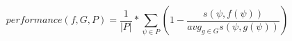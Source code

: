 \documentclass{llncs}
\begin{document}
\begin{equation} \label{eq:space}
  \mathit{performance}(f, G, P) = \frac{1}{|P|} * \sum_{\psi \in P}{\left( 1 -
    \frac{
      s(\psi,f(\psi))
    }{
        \mathit{avg}_{g\in G}{s(\psi,g(\psi))}
    } \right)
  }
\end{equation}
\end{document}
